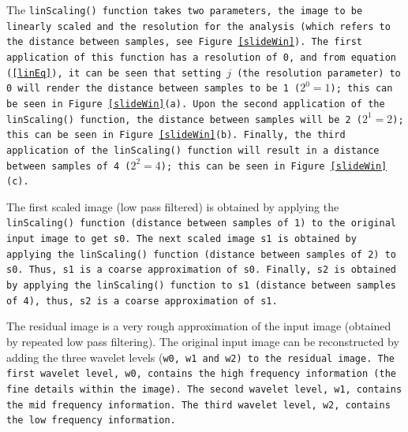 \documentclass[12pt]{report}
\begin{document}
\vspace{0.5cm}
\par
The \tt \footnotesize linScaling() \normalsize \rm function takes two parameters, the image to be linearly 
scaled and the resolution for the analysis (which refers to the distance between samples, see Figure \ref{slideWin}).
The first application of this function has a resolution of 0,
and from equation (\ref{linEq}), it can be seen that setting $j$ (the resolution parameter) to 0 will render 
the distance between samples to be 1 ($2^{0} = 1$); this can be seen in Figure \ref{slideWin}(a).
Upon the second application of the  \tt \footnotesize linScaling() \normalsize \rm function,
the distance between samples will be 2 ($2^{1} = 2$); this can be seen in Figure \ref{slideWin}(b).
Finally, the third application of the \tt \footnotesize linScaling() \normalsize \rm function
will result in a distance between samples of 4 ($2^{2} = 4$);
this can be seen in Figure \ref{slideWin}(c).

The first scaled image (low pass filtered) is obtained by applying the \tt \footnotesize linScaling() \normalsize \rm function
(distance between samples of 1) to the original input image to get \tt \footnotesize s0\normalsize \rm.
The next scaled image \tt \footnotesize s1 \normalsize \rm is obtained by applying the 
\tt \footnotesize linScaling() \normalsize \rm function (distance between samples of 2) to 
\tt \footnotesize s0\normalsize \rm. Thus, \tt \footnotesize s1 \normalsize \rm is a coarse approximation 
of \tt \footnotesize s0\normalsize \rm. Finally, \tt \footnotesize s2 \normalsize \rm is obtained by applying
the \tt \footnotesize linScaling() \normalsize \rm function to \tt \footnotesize s1 \normalsize \rm (distance
between samples of 4), thus, \tt \footnotesize s2 \normalsize \rm is a coarse approximation of
\tt \footnotesize s1\normalsize \rm.


The residual image is a very rough approximation of the input image (obtained by repeated low pass filtering).
The original input image can be reconstructed by adding the three wavelet levels
(\tt \footnotesize w0\normalsize \rm,
\tt \footnotesize w1 \normalsize \rm and
\tt \footnotesize w2\normalsize \rm)
to the residual image.
The first wavelet level, \tt \footnotesize w0\normalsize \rm, contains the high frequency information (the fine details within the image).
The second wavelet level, \tt \footnotesize w1\normalsize \rm, contains the mid frequency information.
The third wavelet level, \tt \footnotesize w2\normalsize \rm, contains the low frequency information.
\end{document}
